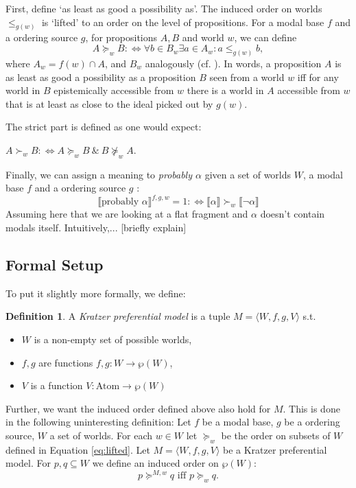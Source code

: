 \documentclass{article}
\theoremstyle{definition}
\newtheorem{definition}{Definition}
\newcommand{\lb}{\llbracket}
\newcommand{\rb}{\rrbracket}
\begin{document}
First, define `as least as good a possibility as'.
The induced order on worlds $\leq_{g(w)}$ is `lifted' to an order on the level of propositions.
For a modal base $f$ and a ordering source $g$, for propositions $A,B$ and world $w$, we can define
\begin{equation}
    \label{eq:lifted}
    A \succeq_w B :\iff \forall b \in B_w \exists a \in A_w: a \leq_{g(w)} b,
\end{equation}
where $A_w = f(w) \cap A$, and $B_w$ analogously (cf. \cite[][p.~519]{holliday13_measur}).
In words, a proposition $A$ is as least as good a possibility as a proposition $B$ seen from a world $w$ iff for any world in $B$ epistemically accessible from $w$ there is a world in $A$ accessible from $w$ that is at least as close to the ideal picked out by $g(w)$.

The strict part is defined as one would expect:

\noindent $A \succ_w B :\iff {A \succeq_w B ~\&~ B \not\succeq_w A}$.  

Finally, we can assign a meaning to \emph{probably $\alpha$} given a set of worlds $W$, a modal base $f$ and a ordering source $g$ \parencite[][p.~645]{kratzer91_modal}:
\begin{equation}
\llbracket \text{probably } \alpha \rrbracket^{f,g,w} = 1 :\iff \lb \alpha \rb \succ_w \lb \neg\alpha \rb
\end{equation}
Assuming here that we are looking at a flat fragment and $\alpha$ doesn't contain modals itself.
Intuitively,... [briefly explain]

\subsection{Formal Setup}

To put it slightly more formally, we define: 
\begin{definition}
    A \emph{Kratzer preferential model} is a tuple $M = \langle W,f,g,V \rangle$ s.t.
    \begin{itemize}[nosep]
\renewcommand\labelitemi{--}
      \item $W$ is a non-empty set of possible worlds,
      \item $f,g$ are functions $f,g: W \rightarrow \wp(W)$,
      \item $V$ is a function $V: \text{Atom} \rightarrow \wp(W)$
    \end{itemize}
\end{definition}

Further, we want the induced order defined above also hold for $M$.
This is done in the following uninteresting definition:
Let $f$ be a modal base, $g$ be a ordering source, $W$ a set of worlds.
For each $w \in W$ let $\succeq_w$ be the order on subsets of $W$ defined in
Equation \ref{eq:lifted}.
Let $M = \langle W,f,g,V \rangle$ be a Kratzer preferential model.
For $p,q \subseteq W$ we define an induced order on $\wp(W)$:   
\begin{equation}
    \label{eq:induced}
       p \succeq^{M,w} q \text{ iff } p \succeq_w q.
\end{equation}
    
\end{document}
